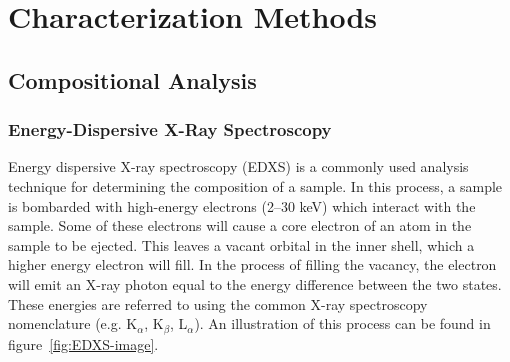 \chapter{Characterization Methods}
\label{ch:characterization}
\thispagestyle{empty}

%
%
%
%
%
%
%
%
%
%
%

\section{Compositional Analysis}


\subsection{Energy-Dispersive X-Ray Spectroscopy}

Energy dispersive X-ray spectroscopy (EDXS) is a commonly used analysis technique for determining the composition of a sample. In this process, a sample is bombarded with high-energy electrons (2--30 keV) which interact with the sample. Some of these electrons will cause a core electron of an atom in the sample to be ejected. This leaves a vacant orbital in the inner shell, which a higher energy electron will fill. In the process of filling the vacancy, the electron will emit an X-ray photon equal to the energy difference between the two states. These energies are referred to using the common X-ray spectroscopy nomenclature (e.g. K$_{\alpha}$, K$_{\beta}$, L$_{\alpha}$). An illustration of this process can be found in figure~\ref{fig:EDXS-image}.  

